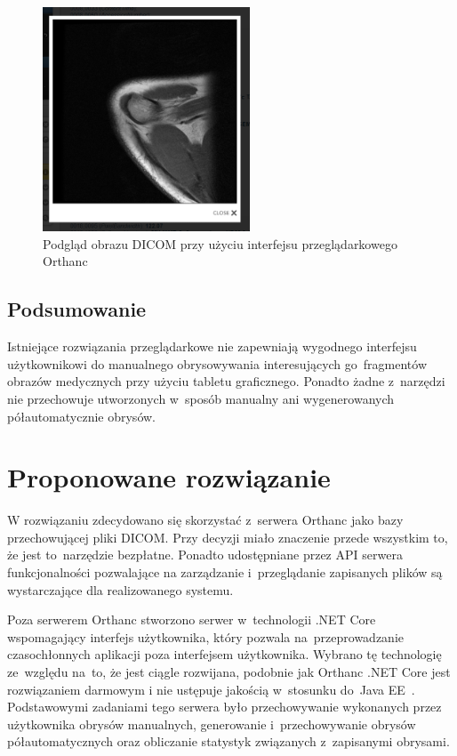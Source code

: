 \documentclass[a4paper,11pt,twoside,openright]{report}
\theoremstyle{definition}
\begin{document}
\begin{figure}[tb!]
	\center
	\includegraphics[width=0.55\textwidth]{Orthanc-preview}
	\caption{Podgląd obrazu DICOM przy użyciu interfejsu przeglądarkowego Orthanc}
    	\label{fig:Orthanc-preview}
\end{figure}


\subsection {Podsumowanie}

Istniejące rozwiązania przeglądarkowe nie zapewniają wygodnego interfejsu użytkownikowi
do manualnego obrysowywania interesujących go~fragmentów obrazów medycznych przy użyciu tabletu graficznego.
Ponadto żadne z~narzędzi nie przechowuje utworzonych w~sposób manualny
ani wygenerowanych półautomatycznie obrysów.

\section {Proponowane rozwiązanie}

W rozwiązaniu zdecydowano się skorzystać z~serwera Orthanc jako bazy przechowującej
pliki DICOM. Przy decyzji miało znaczenie przede wszystkim to, że jest to~narzędzie
bezpłatne. Ponadto udostępniane przez API serwera funkcjonalności pozwalające na
zarządzanie i~przeglądanie zapisanych plików są wystarczające dla realizowanego systemu.

Poza serwerem Orthanc stworzono serwer w~technologii .NET Core \cite{Dotnet}
wspomagający interfejs użytkownika, który pozwala na~przeprowadzanie czasochłonnych
aplikacji poza interfejsem użytkownika. Wybrano tę technologię ze~względu na~to,
że jest ciągle rozwijana, podobnie jak Orthanc .NET Core jest rozwiązaniem darmowym
i nie ustępuje jakością w~stosunku do~Java EE~\cite{Dlaczego dotnet}.
Podstawowymi zadaniami tego serwera było przechowywanie
wykonanych przez użytkownika obrysów manualnych, generowanie i~przechowywanie
obrysów półautomatycznych oraz obliczanie statystyk związanych z~zapisanymi obrysami.
\end{document}
